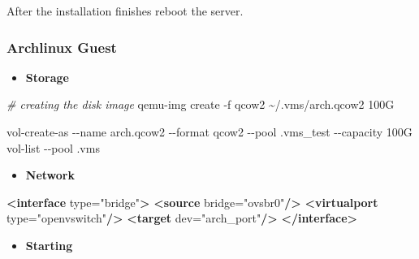 \documentclass[
  14pt,
  english,
  a4paper,
]{scrreprt}
\newenvironment{Shaded}{}{}
\newcommand{\CommentTok}[1]{\textcolor[rgb]{0.38,0.63,0.69}{\textit{#1}}}
\newcommand{\ExtensionTok}[1]{#1}
\newcommand{\KeywordTok}[1]{\textcolor[rgb]{0.00,0.44,0.13}{\textbf{#1}}}
\newcommand{\NormalTok}[1]{#1}
\newcommand{\OtherTok}[1]{\textcolor[rgb]{0.00,0.44,0.13}{#1}}
\newcommand{\StringTok}[1]{\textcolor[rgb]{0.25,0.44,0.63}{#1}}
\providecommand{\tightlist}{%
  \setlength{\itemsep}{0pt}\setlength{\parskip}{0pt}}
\begin{document}
After the installation finishes reboot the server.

\hypertarget{archlinux-guest}{%
\subsubsection{Archlinux Guest}\label{archlinux-guest}}

\begin{itemize}
\tightlist
\item
  \textbf{Storage}
\end{itemize}

\begin{Shaded}
\begin{Highlighting}[]
\CommentTok{\# creating the disk image}
\ExtensionTok{qemu{-}img}\NormalTok{ create {-}f qcow2 \textasciitilde{}/.vms/arch.qcow2 100G}
\end{Highlighting}
\end{Shaded}

\begin{Shaded}
\begin{Highlighting}[]
\ExtensionTok{vol{-}create{-}as}\NormalTok{ {-}{-}name arch.qcow2 {-}{-}format qcow2 {-}{-}pool .vms\_test {-}{-}capacity 100G}
\ExtensionTok{vol{-}list}\NormalTok{ {-}{-}pool .vms}
\end{Highlighting}
\end{Shaded}

\begin{itemize}
\tightlist
\item
  \textbf{Network}
\end{itemize}

\begin{Shaded}
\begin{Highlighting}[]
\KeywordTok{\textless{}interface}\OtherTok{ type=}\StringTok{"bridge"}\KeywordTok{\textgreater{}}
  \KeywordTok{\textless{}source}\OtherTok{ bridge=}\StringTok{"ovsbr0"}\KeywordTok{/\textgreater{}}
  \KeywordTok{\textless{}virtualport}\OtherTok{ type=}\StringTok{"openvswitch"}\KeywordTok{/\textgreater{}}
  \KeywordTok{\textless{}target}\OtherTok{ dev=}\StringTok{"arch\_port"}\KeywordTok{/\textgreater{}}
\KeywordTok{\textless{}/interface\textgreater{}}
\end{Highlighting}
\end{Shaded}

\begin{itemize}
\tightlist
\item
  \textbf{Starting}
\end{itemize}
\end{document}

